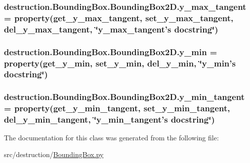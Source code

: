\hypertarget{classdestruction_1_1_bounding_box_1_1_bounding_box2_d_a642703a512760e89f30b1a3f9c0d0781}{
\subsubsection[{y\-\_\-max\-\_\-tangent}]{\setlength{\rightskip}{0pt plus 5cm}destruction.\-Bounding\-Box.\-Bounding\-Box2\-D.\-y\-\_\-max\-\_\-tangent = property({\bf get\-\_\-y\-\_\-max\-\_\-tangent}, {\bf set\-\_\-y\-\_\-max\-\_\-tangent}, {\bf del\-\_\-y\-\_\-max\-\_\-tangent}, \char`\"{}y\-\_\-max\-\_\-tangent's docstring\char`\"{})\hspace{0.3cm}{\ttfamily [static]}}}\label{classdestruction_1_1_bounding_box_1_1_bounding_box2_d_a642703a512760e89f30b1a3f9c0d0781}
\hypertarget{classdestruction_1_1_bounding_box_1_1_bounding_box2_d_ae9d9026b3d1225b1d8833e3598ad59c0}{
\subsubsection[{y\-\_\-min}]{\setlength{\rightskip}{0pt plus 5cm}destruction.\-Bounding\-Box.\-Bounding\-Box2\-D.\-y\-\_\-min = property({\bf get\-\_\-y\-\_\-min}, {\bf set\-\_\-y\-\_\-min}, {\bf del\-\_\-y\-\_\-min}, \char`\"{}y\-\_\-min's docstring\char`\"{})\hspace{0.3cm}{\ttfamily [static]}}}\label{classdestruction_1_1_bounding_box_1_1_bounding_box2_d_ae9d9026b3d1225b1d8833e3598ad59c0}
\hypertarget{classdestruction_1_1_bounding_box_1_1_bounding_box2_d_adba7b4a23144936410eca0c2cf4d6407}{
\subsubsection[{y\-\_\-min\-\_\-tangent}]{\setlength{\rightskip}{0pt plus 5cm}destruction.\-Bounding\-Box.\-Bounding\-Box2\-D.\-y\-\_\-min\-\_\-tangent = property({\bf get\-\_\-y\-\_\-min\-\_\-tangent}, {\bf set\-\_\-y\-\_\-min\-\_\-tangent}, {\bf del\-\_\-y\-\_\-min\-\_\-tangent}, \char`\"{}y\-\_\-min\-\_\-tangent's docstring\char`\"{})\hspace{0.3cm}{\ttfamily [static]}}}\label{classdestruction_1_1_bounding_box_1_1_bounding_box2_d_adba7b4a23144936410eca0c2cf4d6407}


The documentation for this class was generated from the following file\-:\begin{DoxyCompactItemize}
\item 
src/destruction/\hyperlink{_bounding_box_8py}{Bounding\-Box.\-py}\end{DoxyCompactItemize}
